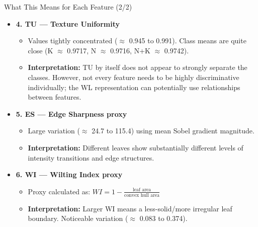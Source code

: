 \documentclass[aspectratio=169, 11pt]{beamer}
\begin{document}
\begin{frame}{What This Means for Each Feature (2/2)}
    \footnotesize
    \begin{itemize}
        \item \textbf{4. TU --- Texture Uniformity}
        \begin{itemize}\scriptsize
            \item Values tightly concentrated ($\approx$ 0.945 to 0.991). Class means are quite close (K $\approx$ 0.9717, N $\approx$ 0.9716, N+K $\approx$ 0.9742).
            \item \textbf{Interpretation:} TU by itself does not appear to strongly separate the classes. However, not every feature needs to be highly discriminative individually; the WL representation can potentially use relationships between features.
        \end{itemize}
        \vspace{0.25cm}
        
        \item \textbf{5. ES --- Edge Sharpness proxy}
        \begin{itemize}\scriptsize
            \item Large variation ($\approx$ 24.7 to 115.4) using mean Sobel gradient magnitude.
            \item \textbf{Interpretation:} Different leaves show substantially different levels of intensity transitions and edge structures.
        \end{itemize}
        \vspace{0.25cm}
        
        \item \textbf{6. WI --- Wilting Index proxy}
        \begin{itemize}\scriptsize
            \item Proxy calculated as: $ WI = 1 - \frac{\text{leaf area}}{\text{convex hull area}} $
            \item \textbf{Interpretation:} Larger WI means a less-solid/more irregular leaf boundary. Noticeable variation ($\approx$ 0.083 to 0.374).
        \end{itemize}
    \end{itemize}
\end{frame}
\end{document}
